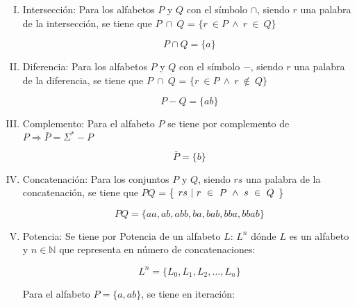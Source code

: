 \begin{enumerate}[I.]
\item {}Intersección: Para los alfabetos $P$ y $Q$ con el símbolo $\cap$, siendo
$r$ una palabra de la intersección, se tiene que $P\ \cap\ Q$ = $\{ r\ \in P\
\wedge\ r\ \in\ Q\}$ {

\ejem

\begin{equation}
P \cap Q = \{a\}
\end{equation}



}\item {}Diferencia: Para los alfabetos $P$ y $Q$ con el símbolo $-$, siendo
$r$ una palabra de la diferencia, se tiene que $P\ \cap\ Q$ = $\{ r\ \in P\
\wedge\ r\ \notin\ Q\}$ {

\ejem

\begin{equation}
P - Q = \{ab\}
\end{equation}


}\item {}Complemento: Para el alfabeto $P$ se tiene por complemento de $P 
\Rightarrow \bar{P} = \Sigma^* - P$ {

\ejem

\begin{equation}
\bar{P} = \{b\}
\end{equation}



}\item {}Concatenación: Para los conjuntos $P$ y $Q$, siendo $rs$ una palabra de
la concatenación, se tiene que $PQ$ = \{ $rs\ \arrowvert\ r\ \in\ P\ \wedge\ s\
\in\ Q$ \} {

\ejem

\begin{equation}
PQ = \{aa,ab,abb,ba,bab,bba,bbab\}
\end{equation}

}\item {}Potencia: Se tiene por Potencia de un alfabeto $L$: $L^n$ dónde $L$ es 
un 
alfabeto y $n \in \mathbb{N}$ que representa en número de concatenaciones: {

\begin{equation}
L^n = \{L_0, L_1, L_2, \ldots, L_n\}
\end{equation}


\ejem Para el alfabeto $P = \{a,ab\}$, se tiene en iteración:

}
\end{enumerate}

